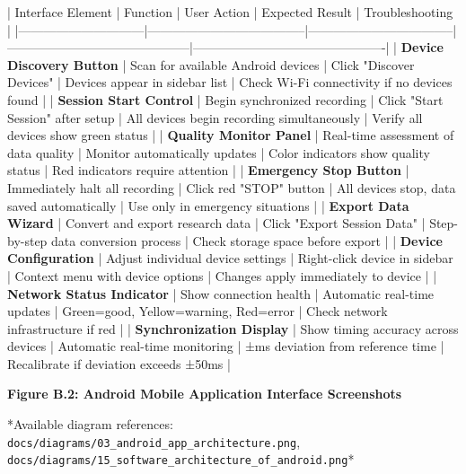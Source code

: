 \documentclass[12pt,a4paper]{article}
\begin{document}
| Interface Element            | Function                             | User Action                       | Expected Result                            | Troubleshooting                              |
|------------------------------|--------------------------------------|-----------------------------------|--------------------------------------------|----------------------------------------------|
| \textbf{Device Discovery Button}  | Scan for available Android devices   | Click "Discover Devices"          | Devices appear in sidebar list             | Check Wi-Fi connectivity if no devices found |
| \textbf{Session Start Control}    | Begin synchronized recording         | Click "Start Session" after setup | All devices begin recording simultaneously | Verify all devices show green status         |
| \textbf{Quality Monitor Panel}    | Real-time assessment of data quality | Monitor automatically updates     | Color indicators show quality status       | Red indicators require attention             |
| \textbf{Emergency Stop Button}    | Immediately halt all recording       | Click red "STOP" button           | All devices stop, data saved automatically | Use only in emergency situations             |
| \textbf{Export Data Wizard}       | Convert and export research data     | Click "Export Session Data"       | Step-by-step data conversion process       | Check storage space before export            |
| \textbf{Device Configuration}     | Adjust individual device settings    | Right-click device in sidebar     | Context menu with device options           | Changes apply immediately to device          |
| \textbf{Network Status Indicator} | Show connection health               | Automatic real-time updates       | Green=good, Yellow=warning, Red=error      | Check network infrastructure if red          |
| \textbf{Synchronization Display}  | Show timing accuracy across devices  | Automatic real-time monitoring    | ±ms deviation from reference time          | Recalibrate if deviation exceeds ±50ms       |

\textbf{Figure B.2: Android Mobile Application Interface Screenshots}

*Available diagram
references: \texttt{docs/diagrams/03\_android\_app\_architecture.png}, \texttt{docs/diagrams/15\_software\_architecture\_of\_android.png}*
\end{document}
